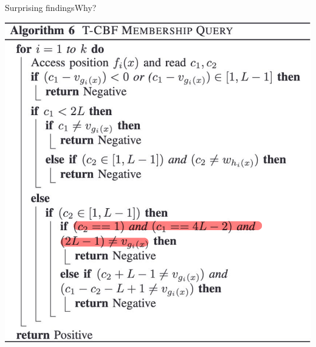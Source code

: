 \documentclass[
  english,            %
  aspectratio=169,    %
]{tumbeamer}
\begin{document}
\begin{frame}{Surprising findings}{Why?}
\begin{minipage}{0.5\textwidth}
\end{minipage}
\begin{minipage}{0.35\textwidth}
    \includegraphics[width=\linewidth]{img/tbf_lookup_pseudo_mark.pdf}
\end{minipage}

\end{frame}
\end{document}
